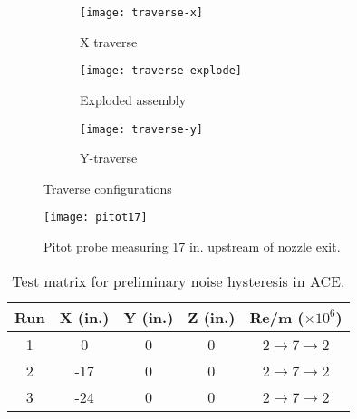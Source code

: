 \begin{figure}[ht]
    \centering
    \begin{subfigure}[b]{0.4\textwidth}
            \texttt{[image: traverse-x]}
        \caption{X traverse}
        \label{fig:traverse-x}
    \end{subfigure}
    \begin{subfigure}[b]{0.22\textwidth}
            \texttt{[image: traverse-explode]}
        \caption{Exploded assembly}
        \label{fig:traverse-explode}
    \end{subfigure}
    \begin{subfigure}[b]{0.35\textwidth}
            \texttt{[image: traverse-y]}
        \caption{Y-traverse}
        \label{fig:traverse-y}
    \end{subfigure}
    \caption{Traverse configurations}
    \label{fig:traverse}
\end{figure}

\begin{figure}[ht]
    \centering
    \texttt{[image: pitot17]}
    \caption{Pitot probe measuring 17 in. upstream of nozzle exit.}
    \label{fig:pitot17}
\end{figure}

\begin{table}[ht]
    \centering
    \label{tab:ace-survey}
    \begin{tabular}{|c|c|c|c|c|}
        \hline
    \textbf{Run} & \textbf{X (in.)} & \textbf{Y (in.)} & \textbf{Z (in.)} & \textbf{Re/m ($\times10^6$)} \\ \hline
        1 & 0 & 0 & 0 & 2$\to$7$\to$2 \\ \hline
        2 & -17 & 0 & 0 & 2$\to$7$\to$2 \\ \hline
        3 & -24 & 0 & 0 & 2$\to$7$\to$2 \\ \hline
    \end{tabular}
    \caption{Test matrix for preliminary noise hysteresis in ACE.}
\end{table}

